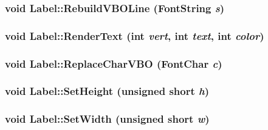 \hypertarget{class_label_dfd5552e4813ba995a09d6aa85731d72}{
\subsubsection[{RebuildVBOLine}]{\setlength{\rightskip}{0pt plus 5cm}void Label::RebuildVBOLine ({\bf FontString} {\em s})}}
\label{class_label_dfd5552e4813ba995a09d6aa85731d72}


\hypertarget{class_label_d775a052255dc0bcfa5d84f13de6876d}{
\subsubsection[{RenderText}]{\setlength{\rightskip}{0pt plus 5cm}void Label::RenderText (int {\em vert}, \/  int {\em text}, \/  int {\em color})}}
\label{class_label_d775a052255dc0bcfa5d84f13de6876d}


\hypertarget{class_label_35b537e0b6c27f34a73bd2632b071c37}{
\subsubsection[{ReplaceCharVBO}]{\setlength{\rightskip}{0pt plus 5cm}void Label::ReplaceCharVBO ({\bf FontChar} {\em c})}}
\label{class_label_35b537e0b6c27f34a73bd2632b071c37}


\hypertarget{class_label_1237536d3b3a0eb3f4b0408c647e5733}{
\subsubsection[{SetHeight}]{\setlength{\rightskip}{0pt plus 5cm}void Label::SetHeight (unsigned short {\em h})}}
\label{class_label_1237536d3b3a0eb3f4b0408c647e5733}


\hypertarget{class_label_3a4df4c494eff40456404ddcef31aa25}{
\subsubsection[{SetWidth}]{\setlength{\rightskip}{0pt plus 5cm}void Label::SetWidth (unsigned short {\em w})}}
\label{class_label_3a4df4c494eff40456404ddcef31aa25}


